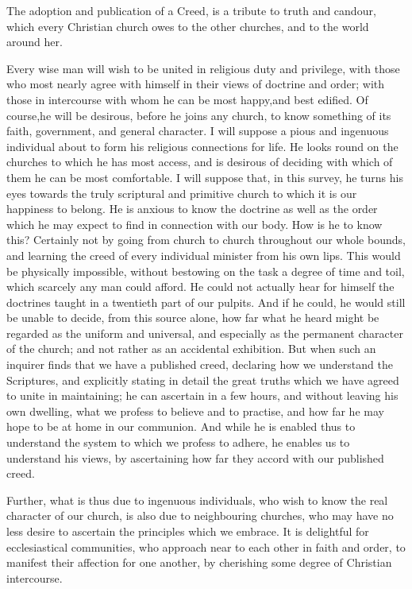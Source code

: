 \documentclass[
]{book}
\begin{document}
The adoption and publication of a Creed, is a tribute to truth and candour, which every Christian church owes to the other churches, and to the world around her.

Every wise man will wish to be united in religious duty and privilege, with those who most nearly agree with himself in their views of doctrine and order; with those in intercourse with whom he can be most happy,and best edified. Of course,he will be desirous, before he joins any church, to know something of its faith, government, and general character. I will suppose a pious and ingenuous individual about to form his religious connections for life. He looks round on the churches to which he has most access, and is desirous of deciding with which of them he can be most comfortable. I will suppose that, in this survey, he turns his eyes towards the truly scriptural and primitive church to which it is our happiness to belong. He is anxious to know the doctrine as well as the order which he may expect to find in connection with our body. How is he to know this? Certainly not by going from church to church throughout our whole bounds, and learning the creed of every individual minister from his own lips. This would be physically impossible, without bestowing on the task a degree of time and toil, which scarcely any man could afford. He could not actually hear for himself the doctrines taught in a twentieth part of our pulpits. And if he could, he would still be unable to decide, from this source alone, how far what he heard might be regarded as the uniform and universal, and especially as the permanent character of the church; and not rather as an accidental exhibition. But when such an inquirer finds that we have a published creed, declaring how we understand the Scriptures, and explicitly stating in detail the great truths which we have agreed to unite in maintaining; he can ascertain in a few hours, and without leaving his own dwelling, what we profess to believe and to practise, and how far he may hope to be at home in our communion. And while he is enabled thus to understand the system to which we profess to adhere, he enables us to understand his views, by ascertaining how far they accord with our published creed.

Further, what is thus due to ingenuous individuals, who wish to know the real character of our church, is also due to neighbouring churches, who may have no less desire to ascertain the principles which we embrace. It is delightful for ecclesiastical communities, who approach near to each other in faith and order, to manifest their affection for one another, by cherishing some degree of Christian intercourse.
\end{document}
